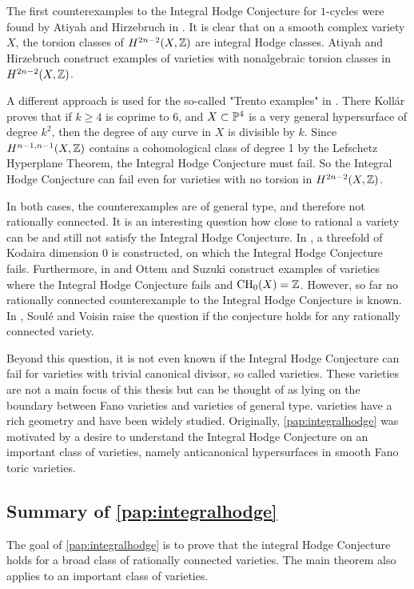 The first counterexamples to the Integral Hodge Conjecture for $1$-cycles were found by Atiyah and Hirzebruch in \cite{AtiyahHirzebruch}. It is clear that on a smooth complex variety $X$, the torsion classes of $H^{2n-2}(X,\Z)$ are integral Hodge classes.  Atiyah and Hirzebruch construct examples of varieties with nonalgebraic torsion classes in $H^{2n-2}(X,\Z)$.

A different approach is used for the so-called "Trento examples" in \cite{KollarTrento}. There Koll\'ar proves that if $k\geq 4$ is coprime to 6, and $X \subset \P^4$ is a very general hypersurface of degree $k^2$, then the degree of any curve in $X$ is divisible by $k$. Since $H^{n-1,n-1}(X,\Z)$ contains a cohomological class of degree 1 by the Lefschetz Hyperplane Theorem, the Integral Hodge Conjecture must fail. So the Integral Hodge Conjecture can fail even for varieties with no torsion in $H^{2n-2}(X,\Z)$.

In both cases, the counterexamples are of general type, and therefore not rationally connected.  It is an interesting question how close to rational a variety can be and still not satisfy the Integral Hodge Conjecture. In \cite{BenoistOttemIntegralHodge}, a threefold of Kodaira dimension 0 is constructed, on which the Integral Hodge Conjecture fails. Furthermore, in \cite{OttemSuzukiPencil} and \cite{OttemSuzukiAcyclic} Ottem and Suzuki construct examples of varieties where the Integral Hodge Conjecture fails and $\CH_0(X) = \Z$. However, so far no rationally connected counterexample to the Integral Hodge Conjecture is known. In \cite{SouleVoisin}, Soulé and Voisin raise the question if the conjecture holds for any rationally connected variety.

Beyond this question, it is not even known if the Integral Hodge Conjecture can fail for varieties with trivial canonical divisor, so called \CY varieties. These varieties are not a main focus of this thesis but can be thought of as lying on the boundary between Fano varieties and varieties of general type. \CY varieties have a rich geometry and have been widely studied. Originally, \cref{pap:integralhodge} was motivated by a desire to understand the Integral Hodge Conjecture on an important class of \CY varieties, namely anticanonical hypersurfaces in smooth Fano toric varieties.

\subsection{Summary of \cref{pap:integralhodge}}
The goal of \cref{pap:integralhodge} is to prove that the integral Hodge Conjecture holds for a broad class of rationally connected varieties. The main theorem also applies to an important class of \CY varieties.

